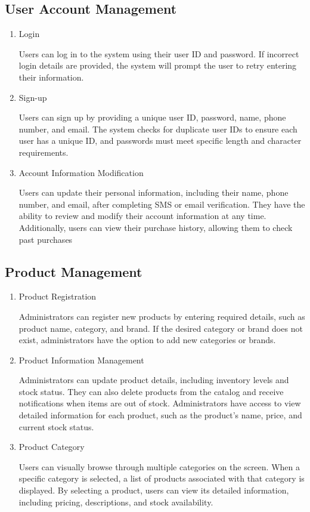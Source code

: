 \documentclass[conference]{IEEEtran}
\begin{document}
\subsection{User Account Management}

\begin{enumerate}
\setlength{\parindent}{2ex}
\setlength{\parskip}{0.5em}
\item Login

Users can log in to the system using their user ID and password. If incorrect login details are provided, the system will prompt the user to retry entering their information. 

\item Sign-up

Users can sign up by providing a unique user ID, password, name, phone number, and email. The system checks for duplicate user IDs to ensure each user has a unique ID, and passwords must meet specific length and character requirements.

\item Account Information Modification

Users can update their personal information, including their name, phone number, and email, after completing SMS or email verification. They have the ability to review and modify their account information at any time. Additionally, users can view their purchase history, allowing them to check past purchases
\end{enumerate}

\subsection{Product Management}

\begin{enumerate}
\setlength{\parindent}{2ex}
\setlength{\parskip}{0.5em}
\item Product Registration

Administrators can register new products by entering required details, such as product name, category, and brand. If the desired category or brand does not exist, administrators have the option to add new categories or brands. 

\item Product Information Management

Administrators can update product details, including inventory levels and stock status. They can also delete products from the catalog and receive notifications when items are out of stock. Administrators have access to view detailed information for each product, such as the product's name, price, and current stock status.

\item Product Category

Users can visually browse through multiple categories on the screen. When a specific category is selected, a list of products associated with that category is displayed. By selecting a product, users can view its detailed information, including pricing, descriptions, and stock availability.

\end{enumerate}
\end{document}
